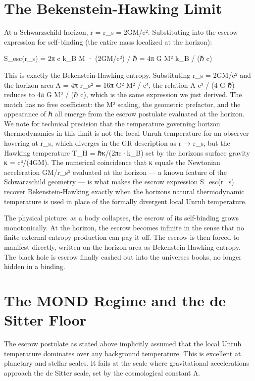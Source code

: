 \documentclass[11pt]{article}
\begin{document}
\section{The Bekenstein-Hawking Limit}\label{the-bekenstein-hawking-limit}

At a Schwarzschild horizon, r = r\_s = 2GM/c². Substituting into the escrow expression for self-binding (the entire mass localized at the horizon):

S\_esc(r\_s) = 2π c k\_B M · (2GM/c²) / ℏ = 4π G M² k\_B / (ℏ c)

This is exactly the Bekenstein-Hawking entropy. Substituting r\_s = 2GM/c² and the horizon area A = 4π r\_s² = 16π G² M² / c⁴, the relation A c³ / (4 G ℏ) reduces to 4π G M² / (ℏ c), which is the same expression we just derived. The match has no free coefficient: the M² scaling, the geometric prefactor, and the appearance of ℏ all emerge from the escrow postulate evaluated at the horizon. We note for technical precision that the temperature governing horizon thermodynamics in this limit is not the local Unruh temperature for an observer hovering at r\_s, which diverges in the GR description as r → r\_s, but the Hawking temperature T\_H = ℏκ/(2πc·k\_B) set by the horizon\textquotesingle s surface gravity κ = c⁴/(4GM). The numerical coincidence that κ equals the Newtonian acceleration GM/r\_s² evaluated at the horizon --- a known feature of the Schwarzschild geometry --- is what makes the escrow expression S\_esc(r\_s) recover Bekenstein-Hawking exactly when the horizon\textquotesingle s natural thermodynamic temperature is used in place of the formally divergent local Unruh temperature.

The physical picture: as a body collapses, the escrow of its self-binding grows monotonically. At the horizon, the escrow becomes infinite in the sense that no finite external entropy production can pay it off. The escrow is then forced to manifest directly, written on the horizon area as Bekenstein-Hawking entropy. The black hole is escrow finally cashed out into the universe\textquotesingle s books, no longer hidden in a binding.

\section{The MOND Regime and the de Sitter Floor}\label{the-mond-regime-and-the-de-sitter-floor}

The escrow postulate as stated above implicitly assumed that the local Unruh temperature dominates over any background temperature. This is excellent at planetary and stellar scales. It fails at the scale where gravitational accelerations approach the de Sitter scale, set by the cosmological constant Λ.
\end{document}
